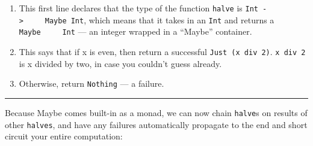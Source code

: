 \documentclass[]{article}
\begin{document}
\begin{enumerate}
\def\labelenumi{\arabic{enumi}.}
\tightlist
\item
  This first line declares that the type of the function \texttt{halve} is
  \texttt{Int\ -\textgreater{}\ \ \ \ \ Maybe\ Int}, which means that it takes
  in an \texttt{Int} and returns a \texttt{Maybe\ \ \ \ \ Int} --- an integer
  wrapped in a ``Maybe'' container.
\item
  This says that if x is even, then return a successful
  \texttt{Just\ (x\ \textasciigrave{}div\textasciigrave{}\ 2)}.
  \texttt{x\ \textasciigrave{}div\textasciigrave{}\ 2} is x divided by two, in
  case you couldn't guess already.
\item
  Otherwise, return \texttt{Nothing} --- a failure.
\end{enumerate}

\begin{center}\rule{0.5\linewidth}{0.5pt}\end{center}

Because Maybe comes built-in as a monad, we can now chain \texttt{halve}s on
results of other \texttt{halves}, and have any failures automatically propagate
to the end and short circuit your entire computation:
\end{document}
